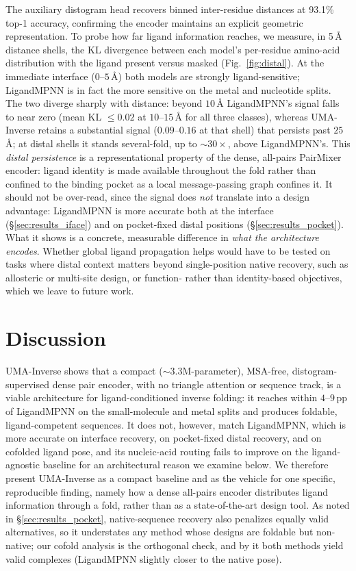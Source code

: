 \documentclass[11pt,letterpaper]{article}
\begin{document}
The auxiliary distogram head recovers binned inter-residue distances at 93.1\% top-1 accuracy,
confirming the encoder maintains an explicit geometric representation. To probe how far ligand
information reaches, we measure, in 5\,{\AA} distance shells, the KL divergence between each model's
per-residue amino-acid distribution with the ligand present versus masked (Fig.~\ref{fig:distal}).
At the immediate interface ($0$--$5$\,{\AA}) both models are strongly ligand-sensitive; LigandMPNN is
in fact the more sensitive on the metal and nucleotide splits. The two diverge sharply with distance:
beyond $10$\,{\AA} LigandMPNN's signal falls to near zero (mean KL $\le 0.02$ at $10$--$15$\,{\AA} for
all three classes), whereas UMA-Inverse retains a substantial signal ($0.09$--$0.16$ at that shell)
that persists past $25$\,{\AA}; at distal shells it stands several-fold, up to $\sim$$30\times$, above LigandMPNN's.
This \emph{distal persistence} is a representational property of the dense, all-pairs PairMixer
encoder: ligand identity is made available throughout the fold rather than confined to the binding
pocket as a local message-passing graph confines it. It should not be over-read, since the signal
does \emph{not} translate into a design advantage: LigandMPNN is more accurate both at the interface
(\S\ref{sec:results_iface}) and on pocket-fixed distal positions (\S\ref{sec:results_pocket}). What it
shows is a concrete, measurable difference in \emph{what the architecture encodes}. Whether global
ligand propagation helps would have to be tested on tasks where distal context matters beyond
single-position native recovery, such as allosteric or multi-site design, or function- rather than
identity-based objectives, which we leave to future work.

\section{Discussion}
\label{sec:discussion}

UMA-Inverse shows that a compact ($\sim$$3.3$M-parameter), MSA-free, distogram-supervised dense pair
encoder, with no triangle attention or sequence track, is a viable architecture for
ligand-conditioned inverse folding: it reaches within $4$--$9$\,pp of
LigandMPNN on the small-molecule and metal splits and produces foldable,
ligand-competent sequences. It does not, however, match LigandMPNN, which is more accurate on
interface recovery, on pocket-fixed distal recovery, and on cofolded ligand pose, and its
nucleic-acid routing fails to improve on the ligand-agnostic baseline for an
architectural reason we examine below. We therefore present
UMA-Inverse as a compact baseline and as the vehicle for one specific, reproducible finding, namely how a
dense all-pairs encoder distributes ligand information through a fold, rather than as a
state-of-the-art design tool. As noted in \S\ref{sec:results_pocket}, native-sequence recovery also
penalizes equally valid alternatives, so it understates any
method whose designs are foldable but non-native; our cofold analysis is the orthogonal check, and by
it both methods yield valid complexes (LigandMPNN slightly closer to the native pose).
\end{document}
